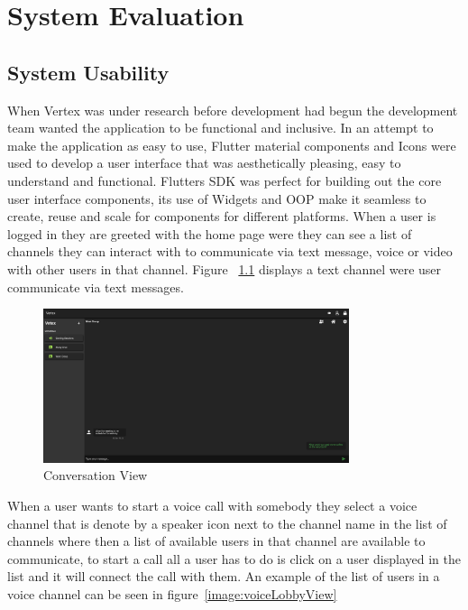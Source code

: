 \chapter{System Evaluation}


\section{System Usability}
When Vertex was under research before development had begun the development team wanted the application to be functional and inclusive. In an attempt to make the application as easy to use, Flutter material components and Icons were used to develop a user interface that was aesthetically pleasing, easy to understand and functional. Flutters SDK was perfect for building out the core user interface components, its use of Widgets and OOP make it seamless to create, reuse and scale for components for different platforms. When a user is logged in they are greeted with the home page were they can see a list of channels they can interact with to communicate via text message, voice or video with other users in that channel. Figure ~\ref{image:convertionView} displays a text channel were user communicate via text messages.


\begin{figure}[h!]
    \caption{Conversation View}
    \label{image:convertionView}
    \centering
    \includegraphics[width=0.8\textwidth]{images/screenshotsOfPages/conversationScreen.png}
\end{figure}

When a user wants to start a voice call with somebody they select a voice channel that is denote by a speaker icon next to the channel name in the list of channels where then a list of available users in that channel are available to communicate, to start a call all a user has to do is click on a user displayed in the list and it will connect the call with them. An example of the list of users in a voice channel can be seen in figure~\ref{image:voiceLobbyView}

